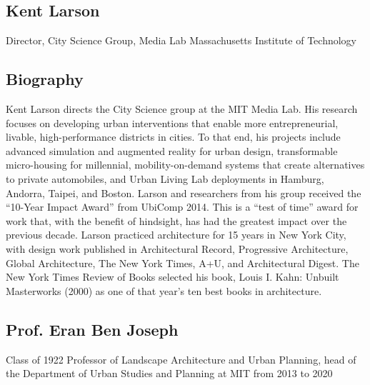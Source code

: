 
\subsection*{Kent Larson} 

{Director, City Science Group, Media Lab}
{Massachusetts Institute of Technology}
\subsection*{Biography}

{Kent Larson directs the City Science group at the MIT Media Lab. His research focuses on developing urban interventions that enable more entrepreneurial, livable, high-performance districts in cities. To that end, his projects include advanced simulation and augmented reality for urban design, transformable micro-housing for millennial, mobility-on-demand systems that create alternatives to private automobiles, and Urban Living Lab deployments in Hamburg, Andorra, Taipei, and Boston. Larson and researchers from his group received the “10-Year Impact Award” from UbiComp 2014. This is a “test of time” award for work that, with the benefit of hindsight, has had the greatest impact over the previous decade. Larson practiced architecture for 15 years in New York City, with design work published in Architectural Record, Progressive Architecture, Global Architecture, The New York Times, A+U, and Architectural Digest. The New York Times Review of Books selected his book, Louis I. Kahn: Unbuilt Masterworks (2000) as one of that year’s ten best books in architecture.}



\subsection*{Prof. Eran Ben Joseph}

{Class of 1922 Professor of Landscape Architecture and Urban Planning, head of the Department of Urban Studies and Planning at MIT from 2013 to 2020}
% 
